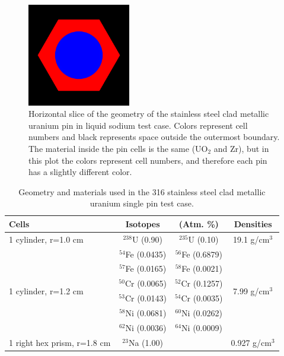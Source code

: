 \documentclass[preprint,12pt]{elsarticle}
\begin{document}
\begin{figure}[h!] 
  \centering
    \includegraphics[width=0.4\textwidth]{graphics/sodiumpin-xy.png}
     \caption{ Horizontal slice of the geometry of the stainless steel clad metallic uranium pin in liquid sodium test case.  Colors represent cell numbers and black represents space outside the outermost boundary.  The material inside the pin cells is the same (UO$_2$ and Zr), but in this plot the colors represent cell numbers, and therefore each pin has a slightly different color. \label{sodiumpin_geom_pic} }
\end{figure}

\begin{table}[h]
\centering
\caption{Geometry and materials used in the 316 stainless steel clad metallic uranium single pin test case.}
\label{sodium_geom}
\begin{tabular}{| l | c  c  | c |}
\hline
Cells & Isotopes & (Atm. \%)     & Densities \\
\hline
\multirow{1}{*}{1 cylinder, r=1.0 cm }   &  $^{238}$U   (0.90)   & $^{235}$U   (0.10)   &    \multirow{1}{*}{19.1 g/cm$^3$} \\
\hline
\multirow{6}{*}{1 cylinder, r=1.2 cm }   &  $^{54}$Fe  (0.0435) & $^{56}$Fe  (0.6879)  &   \multirow{6}{*}{7.99 g/cm$^3$} \\
                                         &  $^{57}$Fe  (0.0165) & $^{58}$Fe  (0.0021)  &   \\
                                         &  $^{50}$Cr  (0.0065) & $^{52}$Cr  (0.1257)  &   \\
                                         &  $^{53}$Cr  (0.0143) & $^{54}$Cr  (0.0035)  &   \\
                                         &  $^{58}$Ni  (0.0681) & $^{60}$Ni  (0.0262)  &   \\
                                         &  $^{62}$Ni  (0.0036) &  $^{64}$Ni  (0.0009) &   \\
\hline
1 right hex prism, r=1.8 cm              &  $^{23}$Na   (1.00)  &                      &    0.927 g/cm$^3$ \\
\hline
\end{tabular}
\end{table}
\end{document}
